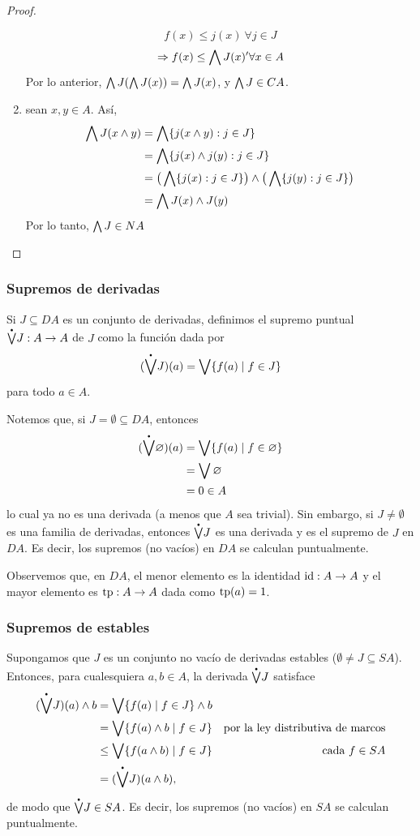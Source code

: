 \begin{proof}
\begin{enumerate}
        $$f(x)\leq j(x) \ \forall j\in J$$
        $$\Rightarrow f(x)\leq \bigwedge J(x) ' \forall x\in A$$
        Por lo anterior, $\bigwedge J(\bigwedge J(x))=\bigwedge J(x)$, y $\bigwedge J \in CA$.
        \item sean $x,y\in A$. Así, 
        \begin{align*}
            \bigwedge J(x\wedge y)&=\bigwedge\{j(x\wedge y):j\in J\}\\
            &=\bigwedge\{j(x)\wedge j(y):j\in J\}\\
            &=\big(\bigwedge\{j(x):j\in J\}\big)
            \wedge\big( \bigwedge\{j(y):j\in J\}\big)\\
            &=\bigwedge J(x)\wedge J(y)
        \end{align*}
        Por lo tanto, $\bigwedge J \in NA$
    \end{enumerate}
\end{proof}

\subsubsection{Supremos de derivadas }

\begin{definition}
  Si $J\subseteq DA$ es un conjunto de derivadas,
  definimos el supremo puntual $\pSup J:A\to A$ de $J$ como la
  función dada por
  \[
    (\pSup J)(a) = \Sup\{f(a) \mid f\in J\}
  \]
  para todo $a\in A$.
\end{definition}
Notemos que, si $J=\emptyset\subseteq DA$, entonces
\begin{align*}
  (\pSup\emptyset)(a)
  &= \Sup\{f(a) \mid f\in\emptyset\} \\
  &= \Sup\emptyset \\
  &= 0 \in A
\end{align*}
lo cual ya no es una derivada (a menos que $A$ sea trivial).
Sin embargo, si $J\neq\emptyset$ es una familia de derivadas,
entonces $\pSup J$ es una derivada y es el supremo de $J$ en
$DA$.
Es decir, los supremos (no vacíos) en $DA$ se calculan
puntualmente.

Observemos que, en $DA$, el menor elemento es la identidad
$\mathrm{id}:A\to A$ y el mayor elemento es $\mathrm{tp}:A\to A$ dada como
$\mathrm{tp}(a)=1$.

\subsubsection{Supremos de estables }

Supongamos que $J$ es un conjunto no vacío de derivadas estables
($\emptyset\neq J\subseteq SA$).
Entonces, para cualesquiera $a,b\in A$, la derivada $\pSup J$ satisface
\begin{align*}
  (\pSup J)(a)\inf b
  &= \Sup\{f(a) \mid f\in J\} \inf b \\
  &= \Sup\{f(a)\inf b \mid f\in J\}
    & \text{por la ley distributiva de marcos} \\
  &\leq \Sup\{f(a\inf b) \mid f\in J \}
    & \text{cada $f\in SA$} \\
  &= (\pSup J)(a\inf b),
\end{align*}
de modo que $\pSup J\in SA$.
Es decir, los supremos (no vacíos) en $SA$ se calculan
puntualmente.

